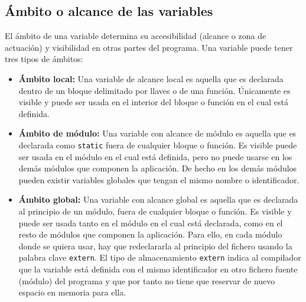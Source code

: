 \subsection{Ámbito o alcance de las variables}{
El ámbito de una variable determina su accesibilidad (alcance o zona de actuación) y visibilidad en otras partes del programa. Una variable puede tener tres tipos de ámbitos:
\begin{itemize}
	\item \textbf{Ámbito local:} Una variable de alcance local es aquella que es declarada dentro de un bloque delimitado por llaves o de una función. Únicamente es visible y puede ser usada en el interior del bloque o función en el cual está definida.
	\item \textbf{Ámbito de módulo:} Una variable con alcance de módulo es aquella que es declarada como \texttt{static} fuera de cualquier bloque o función. Es visible  puede ser usada en el módulo en el cual está definida, pero no puede usarse en los demás módulos que componen la aplicación. De hecho en los demás módulos pueden existir variables globales que tengan el mismo nombre o identificador.
	\item \textbf{Ámbito global:} Una variable con alcance global es aquella que es declarada al principio de un módulo, fuera de cualquier bloque o función. Es visible y puede ser usada tanto en el módulo en el cual está declarada, como en el resto de módulos que componen la aplicación. Para ello, en cada módulo donde se quiera usar, hay que redeclararla al principio del fichero usando la palabra clave \texttt{extern}. El tipo de almacenamiento \texttt{extern} indica al compilador que la variable está definida con el mismo identificador en otro fichero fuente (módulo) del programa y que por tanto no tiene que reservar de nuevo espacio en memoria para ella.
\end{itemize}
}
